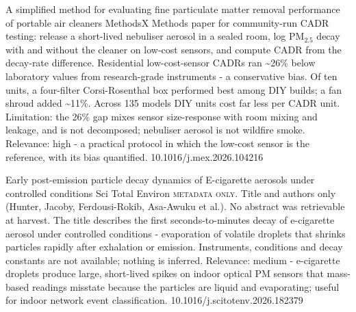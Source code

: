 \documentclass[10pt]{article}
\begin{document}
\par{}\baselineskip{}\baselineskip
{}

{A simplified method for evaluating fine particulate matter removal performance of portable air cleaners}
{MethodsX}
{Methods paper for community-run CADR testing: release a short-lived nebuliser aerosol in a sealed room, log PM$_{2.5}$ decay with and without the cleaner on low-cost sensors, and compute CADR from the decay-rate difference. Residential low-cost-sensor CADRs ran \textasciitilde{}26\% below laboratory values from research-grade instruments - a conservative bias. Of ten units, a four-filter Corsi-Rosenthal box performed best among DIY builds; a fan shroud added \textasciitilde{}11\%. Across 135 models DIY units cost far less per CADR unit. Limitation: the 26\% gap mixes sensor size-response with room mixing and leakage, and is not decomposed; nebuliser aerosol is not wildfire smoke. Relevance: high - a practical protocol in which the low-cost sensor is the reference, with its bias quantified.}
{10.1016/j.mex.2026.104216}

{Early post-emission particle decay dynamics of E-cigarette aerosols under controlled conditions}
{Sci Total Environ}
{\textsc{metadata only.} Title and authors only (Hunter, Jacoby, Ferdousi-Rokib, Asa-Awuku et al.). No abstract was retrievable at harvest. The title describes the first seconds-to-minutes decay of e-cigarette aerosol under controlled conditions - evaporation of volatile droplets that shrinks particles rapidly after exhalation or emission. Instruments, conditions and decay constants are not available; nothing is inferred. Relevance: medium - e-cigarette droplets produce large, short-lived spikes on indoor optical PM sensors that mass-based readings misstate because the particles are liquid and evaporating; useful for indoor network event classification.}
{10.1016/j.scitotenv.2026.182379}

\par{}\baselineskip{}\baselineskip
{}
\end{document}
